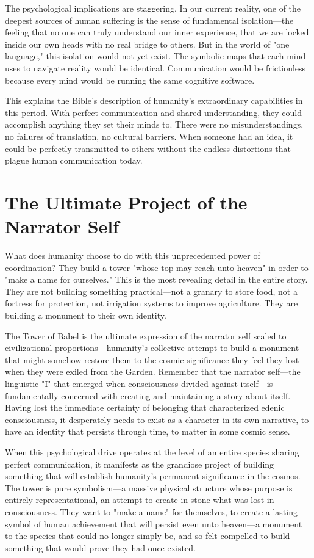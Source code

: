 The psychological implications are staggering. In our current reality, one of the deepest sources of human suffering is the sense of fundamental isolation—the feeling that no one can truly understand our inner experience, that we are locked inside our own heads with no real bridge to others. But in the world of "one language," this isolation would not yet exist. The symbolic maps that each mind uses to navigate reality would be identical. Communication would be frictionless because every mind would be running the same cognitive software.

This explains the Bible's description of humanity's extraordinary capabilities in this period. With perfect communication and shared understanding, they could accomplish anything they set their minds to. There were no misunderstandings, no failures of translation, no cultural barriers. When someone had an idea, it could be perfectly transmitted to others without the endless distortions that plague human communication today.

\section{The Ultimate Project of the Narrator Self}

What does humanity choose to do with this unprecedented power of coordination? They build a tower "whose top may reach unto heaven" in order to "make a name for ourselves." This is the most revealing detail in the entire story. They are not building something practical—not a granary to store food, not a fortress for protection, not irrigation systems to improve agriculture. They are building a monument to their own identity.

The Tower of Babel is the ultimate expression of the narrator self scaled to civilizational proportions—humanity's collective attempt to build a monument that might somehow restore them to the cosmic significance they feel they lost when they were exiled from the Garden. Remember that the narrator self—the linguistic "I" that emerged when consciousness divided against itself—is fundamentally concerned with creating and maintaining a story about itself. Having lost the immediate certainty of belonging that characterized edenic consciousness, it desperately needs to exist as a character in its own narrative, to have an identity that persists through time, to matter in some cosmic sense.

When this psychological drive operates at the level of an entire species sharing perfect communication, it manifests as the grandiose project of building something that will establish humanity's permanent significance in the cosmos. The tower is pure symbolism—a massive physical structure whose purpose is entirely representational, an attempt to create in stone what was lost in consciousness. They want to "make a name" for themselves, to create a lasting symbol of human achievement that will persist even unto heaven—a monument to the species that could no longer simply be, and so felt compelled to build something that would prove they had once existed.

